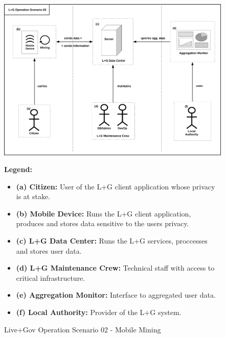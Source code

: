 \begin{figure}
\centering
\includegraphics{diagrams/png/scenario02-MobileMining.png}

\begin{flushleft}
\scriptsize
\textbf{Legend:}

\begin{itemize}
\itemsep1pt\parskip0pt
\item
  \textbf{(a) Citizen:} User of the L+G client application whose privacy
  is at stake.
\item
  \textbf{(b) Mobile Device:} Runs the L+G client application, produces
  and stores data sensitive to the users privacy.
\item
  \textbf{(c) L+G Data Center:} Runs the L+G services, proccesses and
  stores user data.
\item
  \textbf{(d) L+G Maintenance Crew:} Technical staff with access to
  critical infrastructure.
\item
  \textbf{(e) Aggregation Monitor:} Interface to aggregated user data.
\item
  \textbf{(f) Local Authority:} Provider of the L+G system.
\end{itemize}
\end{flushleft}

\caption{Live+Gov Operation Scenario 02 - Mobile Mining}
\label{figure:Live+Gov Operation Scenario 02 - Mobile Mining}
\end{figure}
